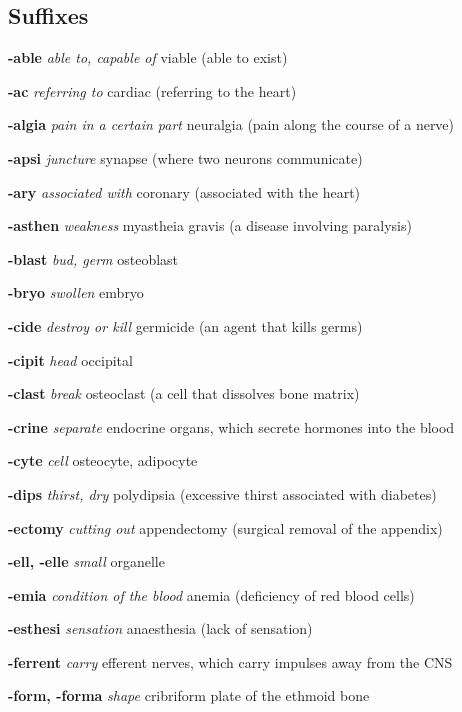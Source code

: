 \documentclass[10pt]{article}
\begin{document}
\begin{multicols}{2}
 \normalsize
 \sectionspace
 \section*{Suffixes}
 \sectionspace
 \footnotesize

 \begin{hangparas}{10pt}{1}
 \textbf{-able} \textit{able to, capable of} viable (able to exist) \par
 \textbf{-ac} \textit{referring to} cardiac (referring to the heart) \par
 \textbf{-algia} \textit{pain in a certain part} neuralgia (pain along the course of a nerve) \par
 \textbf{-apsi} \textit{juncture} synapse (where two neurons communicate) \par
 \textbf{-ary} \textit{associated with} coronary (associated with the heart) \par
 \textbf{-asthen} \textit{weakness} myastheia gravis (a disease involving paralysis) \par
 \textbf{-blast} \textit{bud, germ} osteoblast \par
 \textbf{-bryo} \textit{swollen} embryo \par
 \textbf{-cide} \textit{destroy or kill} germicide (an agent that kills germs) \par
 \textbf{-cipit} \textit{head} occipital \par
 \textbf{-clast} \textit{break} osteoclast (a cell that dissolves bone matrix) \par
 \textbf{-crine} \textit{separate} endocrine organs, which secrete hormones into the blood \par
 \textbf{-cyte} \textit{cell} osteocyte, adipocyte \par
 \textbf{-dips} \textit{thirst, dry} polydipsia (excessive thirst associated with diabetes) \par
 \textbf{-ectomy} \textit{cutting out} appendectomy (surgical removal of the appendix) \par
 \textbf{-ell, -elle} \textit{small} organelle \par
 \textbf{-emia} \textit{condition of the blood} anemia (deficiency of red blood cells) \par
 \textbf{-esthesi} \textit{sensation} anaesthesia (lack of sensation) \par
 \textbf{-ferrent} \textit{carry} efferent nerves, which carry impulses away from the CNS \par
 \textbf{-form, -forma} \textit{shape} cribriform plate of the ethmoid bone \par

\end{hangparas}
\end{multicols}
\end{document}
